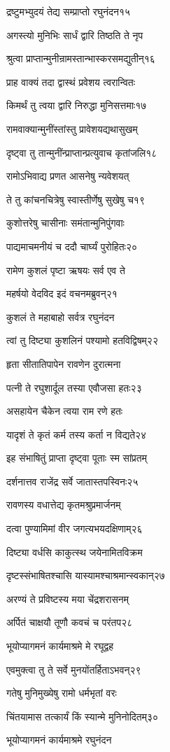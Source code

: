 द्रष्टुमभ्युदयं तेद्य सम्प्राप्तो रघुनंदन१५

अगस्त्यो मुनिभिः सार्धं द्वारि तिष्ठति ते नृप

श्रुत्वा प्राप्तान्मुनीन्रामस्तान्भास्करसमद्युतीन्१६

प्राह वाक्यं तदा द्वास्थं प्रवेशय त्वरान्वितः

किमर्थं तु त्वया द्वारि निरुद्धा मुनिसत्तमाः१७

रामवाक्यान्मुनींस्तांस्तु प्रावेशयद्यथासुखम्

दृष्ट्वा तु तान्मुनींन्प्राप्तान्प्रत्युवाच कृतांजलि१८

रामोऽभिवाद्य प्रणत आसनेषु न्यवेशयत्

ते तु कांचनचित्रेषु स्वास्तीर्णेषु सुखेषु च१९

कुशोत्तरेषु चासीनाः समंतान्मुनिपुंगवाः

पाद्यमाचमनीयं च ददौ चार्घ्यं पुरोहितः२०

रामेण कुशलं पृष्टा ऋषयः सर्व एव ते

महर्षयो वेदविद इदं वचनमब्रुवन्२१

कुशलं ते महाबाहो सर्वत्र रघुनंदन

त्वां तु दिष्ट्या कुशलिनं पश्यामो हतविद्विषम्२२

हृता सीतातिपापेन रावणेन दुरात्मना

पत्नी ते रघुशार्दूल तस्या एवौजसा हतः२३

असहायेन चैकेन त्वया राम रणे हतः

यादृशं ते कृतं कर्म तस्य कर्ता न विद्यते२४

इह संभाषितुं प्राप्ता दृष्ट्वा पूताः स्म सांप्रतम्

दर्शनात्तव राजेंद्र सर्वे जातास्तपस्विनः२५

रावणस्य वधात्तेद्य कृतमश्रुप्रमार्जनम्

दत्वा पुण्यामिमां वीर जगत्यभयदक्षिणाम्२६

दिष्ट्या वर्धसि काकुत्स्थ जयेनामितविक्रम

दृष्टस्संभाषितश्चासि यास्यामश्चाश्रमान्स्वकान्२७

अरण्यं ते प्रविष्टस्य मया चेंद्रशरासनम्

अर्पितं चाक्षयौ तूणौ कवचं च परंतप२८

भूयोप्यागमनं कार्यमाश्रमे मे रघूद्वह

एवमुक्त्वा तु ते सर्वे मुनयोंतर्हिताऽभवन्२९

गतेषु मुनिमुख्येषु रामो धर्मभृतां वरः

चिंतयामास तत्कार्यं किं स्यान्मे मुनिनोदितम्३०

भूयोप्यागमनं कार्यमाश्रमे रघुनंदन

